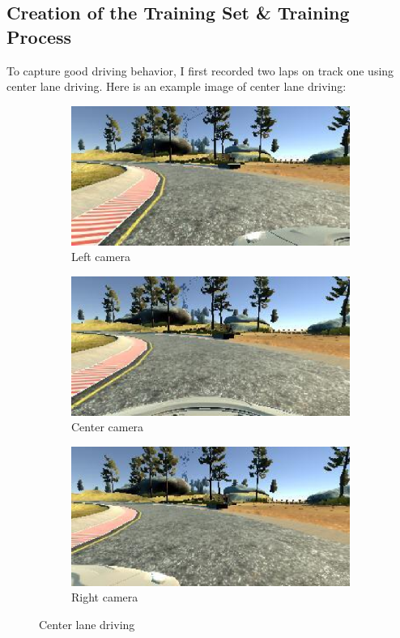 \documentclass[a4paper,12pt]{article}
\begin{document}
\subsection{Creation of the Training Set \& Training Process}
To capture good driving behavior, I first recorded two laps on track one using center lane driving. Here is an example image of center lane driving:

\begin{figure}[H]
\centering
\begin{subfigure}{.3\textwidth}
  \centering
  \includegraphics[width=0.98\linewidth]{figures/center_left.eps}
  \caption{Left camera}
\end{subfigure}
\begin{subfigure}{.3\textwidth}
  \centering
  \includegraphics[width=0.98\linewidth]{figures/center_center.eps}
  \caption{Center camera}
\end{subfigure}
\begin{subfigure}{.3\textwidth}
  \centering
  \includegraphics[width=0.98\linewidth]{figures/center_right.eps}
  \caption{Right camera}
\end{subfigure}
\label{fig:center_lane_driving}
\caption{Center lane driving}
\end{figure}
\end{document}

